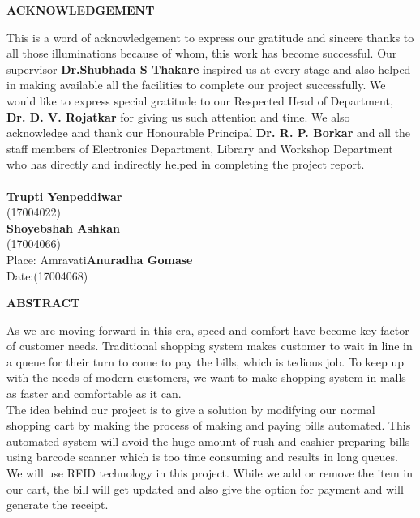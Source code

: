 \documentclass[12pt]{article}
\begin{document}
\newpage
{}
\begin{center}
\large\textbf{ACKNOWLEDGEMENT}
\end{center}
\hspace*{1cm}This is a word of acknowledgement to express our gratitude and sincere thanks to all those illuminations because of whom, this work has become successful. Our supervisor \textbf{Dr.Shubhada S Thakare} inspired us at every stage and also helped in making available all the facilities to complete our project successfully. We would like to express special gratitude to our Respected Head of Department, \textbf{Dr. D. V. Rojatkar} for giving us such attention and time. We also acknowledge and thank our Honourable Principal \textbf{Dr. R. P. Borkar} and all the staff members of Electronics Department, Library and Workshop Department who has directly and indirectly helped in completing the project report.\\
\vspace*{8cm}
\\
\hspace*{12cm}\textbf{Trupti Yenpeddiwar} \\
\hspace*{13cm}(17004022)\\
\hspace*{12cm}\textbf{Shoyebshah Ashkan} \\
\hspace*{13cm}(17004066)\\
Place: Amravati\hspace*{9cm}\textbf{Anuradha Gomase} \\
Date:\hspace*{12cm}(17004068)\\

\newpage
{}
\begin{center}
\large\textbf{ABSTRACT}
\end{center}
\hspace*{1cm}As we are moving forward in this era, speed and comfort have become key factor of customer needs. Traditional shopping system makes customer to wait in line in a queue for their turn to come to pay the bills, which is tedious job. To keep up with the needs of modern customers, we want to make shopping system in malls as faster and comfortable as it can.\\
\hspace*{1cm}The idea behind our project is to give a solution by modifying our normal shopping cart by making the process of making and paying bills automated. This automated system will avoid the huge amount of rush and cashier preparing bills using barcode scanner which is too time consuming and results in long queues. We will use RFID technology in this project. While we add or remove the item in our cart, the bill will get updated and also give the option for payment and will generate the receipt.
\end{document}
